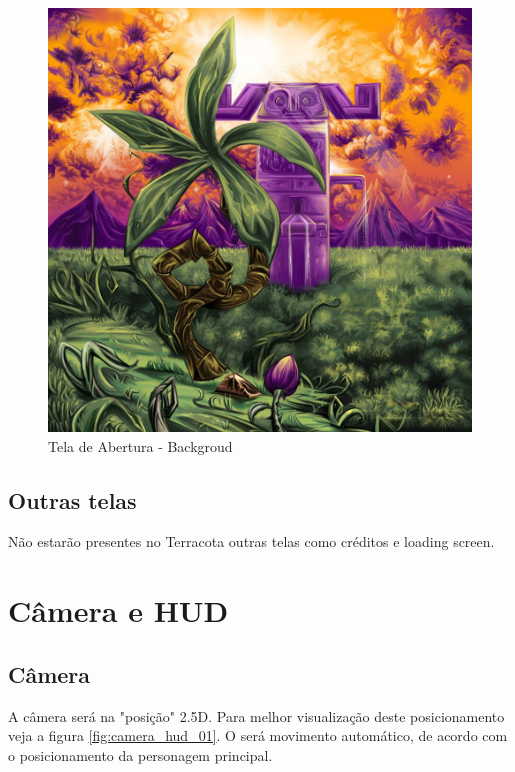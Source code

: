 \documentclass[12pt]{article}
\begin{document}
\begin{figure}[!htb]
    \centering
    \includegraphics[scale=0.4]{background_terracota.jpg}
    \caption{Tela de Abertura - Backgroud}
    \label{fig:background_terracota}
\end{figure}

\subsection{Outras telas}
Não estarão presentes no Terracota outras telas como créditos e loading screen.

\newpage
\section{Câmera e HUD}

\subsection{Câmera}
A câmera será na "posição" 2.5D. Para melhor visualização deste posicionamento
veja a figura \ref{fig:camera_hud_01}. O será movimento automático, de
acordo com o posicionamento da personagem principal.
\end{document}
